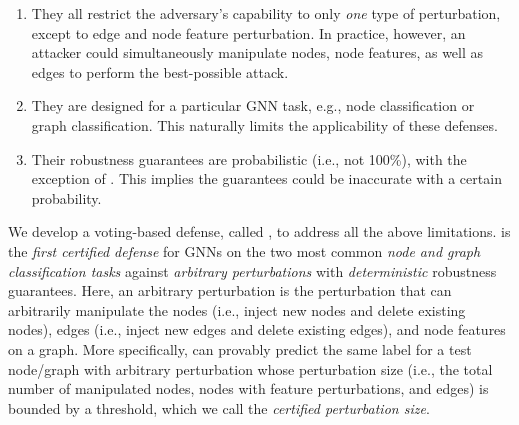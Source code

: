 \begin{enumerate}[leftmargin=*]
\vspace{-2mm}
\item They all restrict the adversary's capability to only 
\emph{one} type of perturbation, except \cite{xia2024gnncert} to edge and node feature perturbation. 
In practice, however, an attacker could  simultaneously manipulate nodes, node features, as well as edges to perform the best-possible attack. 
\vspace{-2mm}
\item They are designed for a particular GNN task, e.g., node classification or graph classification. This naturally limits the applicability of these defenses. 

\vspace{-2mm}
\item Their robustness guarantees are probabilistic (i.e., not 100\%), with the exception of \cite{xia2024gnncert}. This  implies the guarantees could be inaccurate with a certain probability. 
\vspace{-2mm}
\end{enumerate}


 We develop a voting-based defense, called {\name}, to address all the above limitations. 
{\name} is the  \emph{first certified defense} for GNNs on the two most common \emph{node and graph classification tasks} against \emph{arbitrary perturbations} with  \emph{deterministic} robustness guarantees.
Here, an {arbitrary perturbation} is the perturbation that can arbitrarily manipulate the 
nodes (i.e., inject new nodes and delete existing nodes), edges (i.e., inject new edges and delete existing edges), and node features on a graph.  
More specifically, {\name} can provably predict the same label for a test node/graph with arbitrary perturbation whose perturbation size (i.e., 
the total number of manipulated nodes, nodes with feature perturbations, and edges) is bounded by a threshold, which we call the \emph{certified perturbation size}. 


